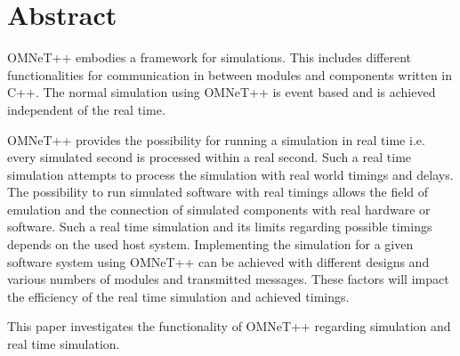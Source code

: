 \chapter{Abstract}


OMNeT++ embodies a framework for simulations. This includes different functionalities for communication in between modules and components written in C++.
The normal simulation using OMNeT++ is event based and is achieved independent of the real time.

OMNeT++ provides the possibility for running a simulation in real time i.e. every simulated second is processed within a real second.
Such a real time simulation attempts to process the simulation with real world timings and delays.
The possibility to run simulated software with real timings allows the field of emulation and the connection of simulated components with real hardware or software.
Such a real time simulation and its limits regarding possible timings depends on the used host system.
Implementing the simulation for a given software system using OMNeT++ can be achieved with different designs and various numbers of modules and transmitted messages.
These factors will impact the efficiency of the real time simulation and achieved timings.

This paper investigates the functionality of OMNeT++ regarding simulation and real time simulation.

